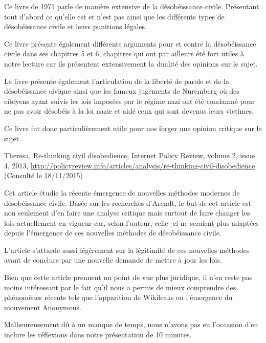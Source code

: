 \documentclass[a4paper, 11pt]{article}
\begin{document}
    \begin{framed}
        Ce livre de 1971 parle de manière extensive de la désobéissance civile.
        Présentant tout d'abord ce qu’elle est et n'est pas ainsi que les
        différents types de désobéissance civile et leurs punitions légales.
        \newline

        Ce livre présente également différents arguments pour et contre la
        désobéissance civile dans ses chapitres 5 et 6, chapitres qui ont par
        ailleurs été fort utiles à notre lecture car ils présentent
        extensivement la dualité des opinions sur le sujet. \newline

        Le livre présente également l'articulation de la liberté de parole et
        de la désobéissance civique ainsi que les fameux jugements de Nuremberg
        où des citoyens ayant suivis les lois imposées par le régime nazi ont
        été condamné pour ne pas avoir désobéis à la loi nazie et aidé ceux qui
        sont devenus leurs victimes. \newline

        Ce livre fut donc particulièrement utile pour nos forger une opinion
        critique sur le sujet. \newline
    \end{framed}


     Theresa, Re-thinking civil disobedience, Internet Policy Review,
    volume 2, issue 4, 2013,
    \url{http://policyreview.info/articles/analysis/re-thinking-civil-disobedience}
    (Consulté le 18/11/2015)

    \begin{framed}
        Cet article étudie la récente émergence de nouvelles méthodes modernes
        de désobéissance civile. Basée sur les recherches d'Arendt, le but de
        cet article est non seulement d'en faire une analyse critique mais
        surtout de faire changer les lois actuellement en vigueur car, selon
        l’auteur, celle -ci ne seraient plus adaptées depuis l'émergence de ces
        nouvelles méthodes de désobéissance civile. \newline

        L'article s'attarde aussi légèrement sur la légitimité de ces nouvelles
        méthodes avant de conclure par une nouvelle demande de mettre à jour
        les lois. \newline

        Bien que cette article prennent un point de vue plus juridique, il n’en
        reste pas moins intéressant par le fait qu’il nous a permis de mieux
        comprendre des phénomènes récents tels que l'apparition de Wikileaks ou
        l'émergence du mouvement Anonymous. \newline

        Malheureusement dû à un manque de temps, nous n’avons pas eu l’occasion
        d’en inclure les réflexions dans notre présentation de 10 minutes.
    \end{framed}
\end{document}
